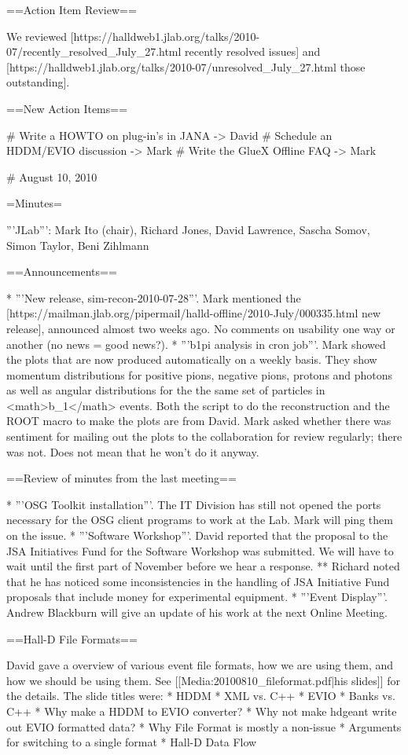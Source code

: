 ==Action Item Review==

We reviewed [https://halldweb1.jlab.org/talks/2010-07/recently_resolved_July_27.html recently resolved issues] and [https://halldweb1.jlab.org/talks/2010-07/unresolved_July_27.html those outstanding].

==New Action Items==

# Write a HOWTO on plug-in's in JANA -> David
# Schedule an HDDM/EVIO discussion -> Mark
# Write the GlueX Offline FAQ -> Mark


# August 10, 2010

=Minutes=

'''JLab''': Mark Ito (chair), Richard Jones, David Lawrence, Sascha Somov, Simon Taylor, Beni Zihlmann

==Announcements==

* '''New release, sim-recon-2010-07-28'''. Mark mentioned the [https://mailman.jlab.org/pipermail/halld-offline/2010-July/000335.html new release], announced almost two weeks ago. No comments on usability one way or another (no news = good news?).
* '''b1pi analysis in cron job'''. Mark showed the plots that are now produced automatically on a weekly basis. They show momentum distributions for positive pions, negative pions, protons and photons as well as angular distributions for the the same set of particles in <math>b_1\pi</math> events. Both the script to do the reconstruction and the ROOT macro to make the plots are from David. Mark asked whether there was sentiment for mailing out the plots to the collaboration for review regularly; there was not. Does not mean that he won't do it anyway.

==Review of minutes from the last meeting==

* '''OSG Toolkit installation'''. The IT Division has still not opened the ports necessary for the OSG client programs to work at the Lab. Mark will ping them on the issue.
* '''Software Workshop'''. David reported that the proposal to the JSA Initiatives Fund for the Software Workshop was submitted. We will have to wait until the first part of November before we hear a response.
** Richard noted that he has noticed some inconsistencies in the handling of JSA Initiative Fund proposals that include money for experimental equipment.
* '''Event Display'''. Andrew Blackburn will give an update of his work at the next Online Meeting.

==Hall-D File Formats==

David gave a overview of various event file formats, how we are using them, and how we should be using them. See [[Media:20100810_fileformat.pdf|his slides]] for the details. The slide titles were:
* HDDM
* XML vs. C++
* EVIO
* Banks vs. C++
* Why make a HDDM to EVIO converter?
* Why not make hdgeant write out EVIO formatted data?
* Why File Format is mostly a non-issue
* Arguments for switching to a single format
* Hall-D Data Flow

